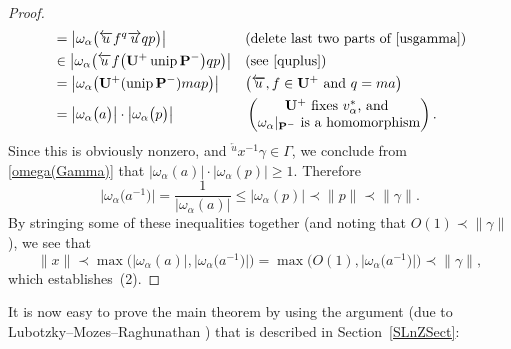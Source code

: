 \documentclass[pdftex]{sigma}
\newcommand{\Pa}{\mathbf{P}}
\newcommand{\Ua}{\mathbf{U}}
\DeclareMathOperator{\unip}{unip}
\numberwithin{equation}{section}
\theoremstyle{definition}
\begin{document}
\begin{proof}
\begin{align*}
	&= \bigl| \omega_\alpha \bigl( \overleftarrow{u} f {}^q \overrightarrow{u} q p \bigr) \bigr|
		&& \text{(delete last two parts of \eqref{usgamma})}
	\\&\in \bigl| \omega_\alpha \bigl( \overleftarrow{u} f \big(\Ua^+ \unip \Pa^-\big) q p \bigr) \bigr|
		&& \text{(see \eqref{quplus})}
	\\&= \bigl| \omega_\alpha \bigl( \Ua^+ (\unip \Pa^-) m a p \bigr) \bigr|
		&& \text{\big($\overleftarrow{u},f \in \Ua^+$ and $q = ma$\big)}
	\\&= \bigl| \omega_\alpha \bigl( a \bigr) \bigr| \cdot \bigl| \omega_\alpha \bigl( p \bigr) \bigr|
		&& \begin{pmatrix} \text{$\Ua^+$ fixes $v_\alpha^*$, and } \\
		\text{$\omega_\alpha|_{\Pa^-}$ is a homomorphism} \end{pmatrix}.
	\end{align*}
Since this is obviously nonzero, and ${}^{\overleftarrow{u}} \! \! x^{-1} \gamma \in \Gamma$, we conclude from \eqref{omega(Gamma)} that $ |\omega_\alpha ( a ) | \cdot |\omega_\alpha ( p ) | \ge 1$. Therefore
	\[ \big|\omega_\alpha\big(a^{-1}\big)\big|
	= \frac{1}{|\omega_\alpha(a)|}
	\le |\omega_\alpha ( p ) |
	\prec \| p\|
	\prec \| \gamma\| .\]
By stringing some of these inequalities together (and noting that $O(1) \prec \| \gamma\|$), we see that
	\[ \| x\|
	 \prec \max \bigl( |\omega_\alpha(a)|, \big|\omega_\alpha\big(a^{-1}\big)\big| \bigr)
	 = \max \bigl( O(1), \big|\omega_\alpha\big(a^{-1}\big)\big| \bigr)
	 \prec \| \gamma\|
	 , \]
which establishes~(2).
\end{proof}

It is now easy to prove the main theorem by using the argument (due to Lubotzky--Mozes--Raghunathan \cite[Section~4]{MR1828742}) that is described in Section~\ref{SLnZSect}:
\end{document}
